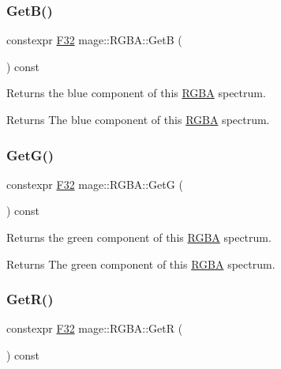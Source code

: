 \subsubsection{\texorpdfstring{Get\+B()}{GetB()}}
{\footnotesize\ttfamily constexpr \mbox{\hyperlink{namespacemage_aa97e833b45f06d60a0a9c4fc22ae02c0}{F32}} mage\+::\+R\+G\+B\+A\+::\+GetB (\begin{DoxyParamCaption}{ }\end{DoxyParamCaption}) const\hspace{0.3cm}{\ttfamily [noexcept]}}

Returns the blue component of this \mbox{\hyperlink{structmage_1_1_r_g_b_a}{R\+G\+BA}} spectrum.

\begin{DoxyReturn}{Returns}
The blue component of this \mbox{\hyperlink{structmage_1_1_r_g_b_a}{R\+G\+BA}} spectrum. 
\end{DoxyReturn}
\mbox{\label{structmage_1_1_r_g_b_a_a39db7aa6065db1aef0c774316865e0ae}} 
\subsubsection{\texorpdfstring{Get\+G()}{GetG()}}
{\footnotesize\ttfamily constexpr \mbox{\hyperlink{namespacemage_aa97e833b45f06d60a0a9c4fc22ae02c0}{F32}} mage\+::\+R\+G\+B\+A\+::\+GetG (\begin{DoxyParamCaption}{ }\end{DoxyParamCaption}) const\hspace{0.3cm}{\ttfamily [noexcept]}}

Returns the green component of this \mbox{\hyperlink{structmage_1_1_r_g_b_a}{R\+G\+BA}} spectrum.

\begin{DoxyReturn}{Returns}
The green component of this \mbox{\hyperlink{structmage_1_1_r_g_b_a}{R\+G\+BA}} spectrum. 
\end{DoxyReturn}
\mbox{\label{structmage_1_1_r_g_b_a_a2f312fc862e792247bb6ba0e5a5390ca}} 
\subsubsection{\texorpdfstring{Get\+R()}{GetR()}}
{\footnotesize\ttfamily constexpr \mbox{\hyperlink{namespacemage_aa97e833b45f06d60a0a9c4fc22ae02c0}{F32}} mage\+::\+R\+G\+B\+A\+::\+GetR (\begin{DoxyParamCaption}{ }\end{DoxyParamCaption}) const\hspace{0.3cm}{\ttfamily [noexcept]}}


